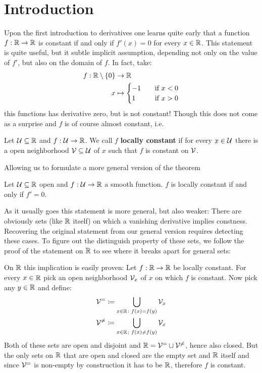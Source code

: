 \chapter*{Introduction}
Upon the first introduction to derivatives one learns quite early that a function
$f: \mathbb{R} \to \mathbb{R}$ is constant if and only if $f'(x) = 0$ for every $x \in \mathbb{R}$. This statement is quite useful,
but it subtle implicit assumption, depending not only on the value of $f'$, but also on the domain
of $f$. In fact, take:
\begin{align*}
	f: \mathbb{R} \setminus \{0\} &\to \mathbb{R} \\
		x &\mapsto \begin{cases}
			-1 \quad&\text{if } x < 0 \\
			 1 \quad&\text{if } x > 0
		\end{cases}
\end{align*}
this functions has derivative zero, but is not constant! Though this does not come as a surprise and $f$ is of course almost constant, i.e.
\begin{definition}
	Let $\mathcal{U} \subseteq \mathbb{R}$ and $f: \mathcal{U} \to \mathbb{R}$. We call $f$ \textbf{locally constant} if for every $x \in \mathcal{U}$
	there is a open neighborhood $\mathcal{V} \subseteq \mathcal{U}$ of $x$ such that $f$ is constant on $\mathcal{V}$.
\end{definition}
Allowing us to formulate a more general version of the theorem
\begin{lemma}
	Let $\mathcal{U} \subseteq \mathbb{R}$ open and $f: \mathcal{U} \to \mathbb{R}$ a smooth function. $f$ is locally constant if and only if
	$f' = 0$.
\end{lemma}
As it usually goes this statement is more general, but also weaker: There are obviously sets (like $\mathbb{R}$ itself) on
which a vanishing derivative implies constness. Recovering the original statement from our general version requires
detecting these cases. To figure out the distinguish property of these sets, we follow the proof of the statement on
$\mathbb{R}$ to see where it breaks apart for general sets:

On $\mathbb{R}$ this implication is easily proven: Let $f: \mathbb{R} \to \mathbb{R}$ be locally constant. For every $x \in \mathbb{R}$
pick an open neighborhood $\mathcal{V}_x$ of $x$ on which $f$ is constant. Now pick any $y \in \mathbb{R}$ and
define:
\begin{align*}
	\mathcal{V}^=      &\coloneqq \bigcup_{x \in \mathbb{R}\colon f(x) = f(y)} \mathcal{V}_x \\
	\mathcal{V}^{\neq} &\coloneqq \bigcup_{x \in \mathbb{R}\colon f(x) \neq f(y)} \mathcal{V}_x
\end{align*}
Both of these sets are open and disjoint and $\mathbb{R} = \mathcal{V}^= \cup \mathcal{V}^{\neq}$, hence also closed.
But the only sets on $\mathbb{R}$ that are open and closed are the empty set and $\mathbb{R}$ itself and since
$\mathcal{V}^=$ is non-empty by construction it has to be $\mathbb{R}$, therefore $f$ is constant.

